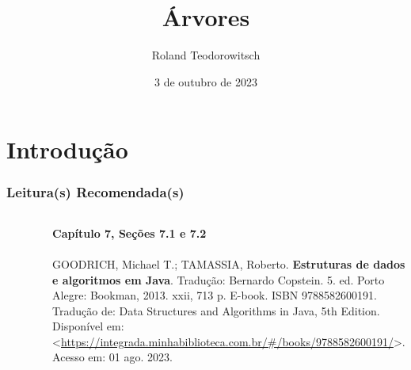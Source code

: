 \documentclass[aspectratio=169]{beamer}
\title[\sc{Árvores}]{Árvores}
\author[Roland Teodorowitsch]{Roland Teodorowitsch}
\institute[ALEST I - EP - PUCRS]{Algoritmos e Estruturas de Dados I - Escola Politécnica - PUCRS}
\date{3 de outubro de 2023}
\begin{document}
\justifying

\begin{frame}
	\titlepage
\end{frame}

\section{Introdução}

\begin{frame}\frametitle{Leitura(s) Recomendada(s)}

\begin{columns}[T]
\begin{column}{0.15\linewidth}
\vspace{-3mm}
\begin{figure}[h]
	\centering
	\includegraphics[height=0.3\paperheight]{imagens/livro_goodrich.jpg}
\end{figure}
\end{column}
\begin{column}{0.85\linewidth}
\tiny{\textbf{Capítulo 7, Seções 7.1 e 7.2}\\
~}\\
\scriptsize{GOODRICH, Michael T.; TAMASSIA, Roberto. \textbf{Estruturas de dados e algoritmos em Java}. Tradução: Bernardo Copstein. 5. ed. Porto Alegre: Bookman, 2013. xxii, 713 p. E-book. ISBN 9788582600191. Tradução de: Data Structures and Algorithms in Java, 5th Edition. Disponível em: \textless{}\url{https://integrada.minhabiblioteca.com.br/\#/books/9788582600191/}\textgreater{}. Acesso em: 01 ago. 2023.}
\end{column}
\end{columns}

\end{frame}

\end{document}
